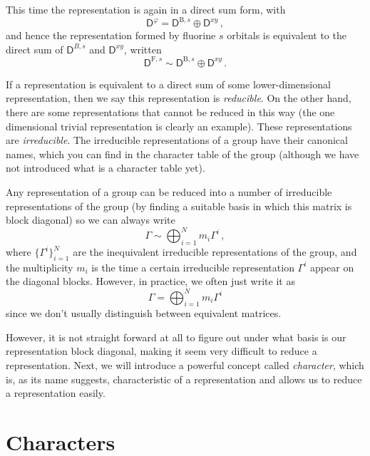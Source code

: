 \documentclass{article}
\theoremstyle{plain}\theoremheaderfont{\normalfont\itshape}\theorembodyfont{\rmfamily}\theoremseparator{.}\newtheorem*{rem}{Remark}\newtheorem*{ex}{Example}\newtheorem*{proof}{Proof}\newtheorem*{altp}{Alternative proof}
\theoremstyle{plain}\theoremheaderfont{\normalfont\bfseries}\theorembodyfont{\rmfamily}\theoremseparator{.}\newtheorem{thm}{Theorem}[section]\newtheorem{lem}[thm]{Lemma}\newtheorem{prop}[thm]{Proposition}\newtheorem*{cor}{Corollary}\newtheorem{defn}[thm]{Definition}\newtheorem{clm}[thm]{Claim}\newtheorem{clminproof}{Claim}\newtheorem*{law}{Law}\newtheorem{pos}[thm]{Postulate}
\theoremstyle{break}\theoremheaderfont{\normalfont\itshape}\theorembodyfont{\rmfamily}\theoremseparator{.\medskip}\newtheorem*{proofskip}{Proof}\newtheorem*{exs}{Examples}\newtheorem*{rems}{Remarks}
\theoremstyle{break}\theoremheaderfont{\normalfont\bfseries}\theorembodyfont{\rmfamily}\theoremseparator{.\medskip}\newtheorem{lemskip}[thm]{Lemma}\newtheorem{defnskip}[thm]{Definition}\newtheorem{propskip}[thm]{Proposition}\newtheorem{thmskip}[thm]{Theorem}
\numberwithin{equation}{section}
\newcommand{\DD}{\mathsf{D}}
\begin{document}
    This time the representation is again in a direct sum form, with
    \begin{equation}
        \DD^{\varphi}=\DD^{\mathrm{B},s}\oplus\DD^{xy}\,,
    \end{equation}
    and hence the representation formed by fluorine \(s\) orbitals is equivalent to the direct sum of \(\DD^{B,s}\) and \(\DD^{xy}\), written
    \begin{equation}
        \DD^{\mathrm{F},s}\sim\DD^{\mathrm{B},s}\oplus\DD^{xy}\,.
    \end{equation}
    
    If a representation is equivalent to a direct sum of some lower-dimensional representation, then we say this representation is \textit{reducible}. On the other hand, there are some representations that cannot be reduced in this way (the one dimensional trivial representation is clearly an example). These representations are \textit{irreducible}. The irreducible representations of a group have their canonical names, which you can find in the character table of the group (although we have not introduced what is a character table yet).
    
    Any representation of a group can be reduced into a number of irreducible representations of the group (by finding a suitable basis in which this matrix is block diagonal) so we can always write
    \begin{equation}
        \Gamma\sim\bigoplus_{i=1}^{N}m_i\Gamma^{i}\,,
    \end{equation}
    where \(\{\Gamma^{i}\}_{i=1}^{N}\) are the inequivalent irreducible representations of the group, and the multiplicity \(m_i\) is the time a certain irreducible representation \(\Gamma^{i}\) appear on the diagonal blocks. However, in practice, we often just write it as
    \begin{equation}
        \Gamma=\bigoplus_{i=1}^{N}m_i\Gamma^{i}
    \end{equation}
    since we don't usually distinguish between equivalent matrices.

    However, it is not straight forward at all to figure out under what basis is our representation block diagonal, making it seem very difficult to reduce a representation. Next, we will introduce a powerful concept called \textit{character}, which is, as its name suggests, characteristic of a representation and allows us to reduce a representation easily.

    \newpage
    \section{Characters}
\end{document}
